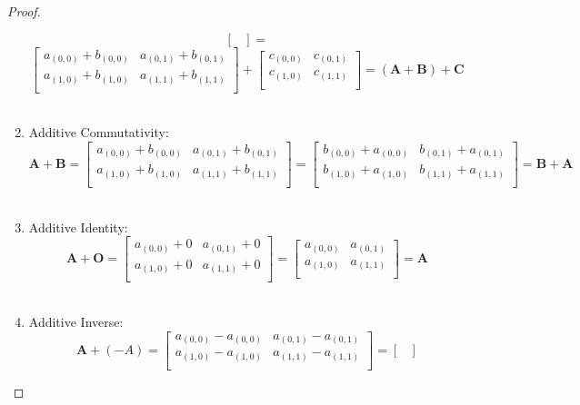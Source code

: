 \documentclass[12pt,oneside]{amsart}
\numberwithin{equation}{section}
\numberwithin{figure}{section}
\theoremstyle{plain}
\theoremstyle{definition}
\begin{document}
\begin{proof}
\begin{enumerate}
\[\begin{bmatrix}
        \end{bmatrix} = \] \[\begin{bmatrix}
        a_{(0,0)} + b_{(0,0)} & a_{(0,1)} + b_{(0,1)} \\
        a_{(1,0)} + b_{(1,0)} & a_{(1,1)} + b_{(1,1)} \\
      \end{bmatrix} + \begin{bmatrix}
        c_{(0,0)} & c_{(0,1)} \\
        c_{(1,0)} & c_{(1,1)} \\
      \end{bmatrix} = (\mathbf{A} + \mathbf{B}) + \mathbf{C}\] \\
    \item Additive Commutativity: \[\mathbf{A} + \mathbf{B} = 
        \begin{bmatrix}
          a_{(0,0)} + b_{(0,0)} & a_{(0,1)} + b_{(0,1)} \\
          a_{(1,0)} + b_{(1,0)} & a_{(1,1)} + b_{(1,1)} \\
        \end{bmatrix} = \begin{bmatrix}
          b_{(0,0)} + a_{(0,0)} & b_{(0,1)} + a_{(0,1)} \\
          b_{(1,0)} + a_{(1,0)} & b_{(1,1)} + a_{(1,1)} \\
        \end{bmatrix} = \mathbf{B} + \mathbf{A}\] \\
    \item Additive Identity: \[\mathbf{A} + \mathbf{O} = 
      \begin{bmatrix}
        a_{(0,0)} + 0 & a_{(0,1)} + 0 \\
        a_{(1,0)} + 0 & a_{(1,1)} + 0 \\
      \end{bmatrix} = \begin{bmatrix}
        a_{(0,0)} & a_{(0,1)} \\
        a_{(1,0)} & a_{(1,1)} \\
      \end{bmatrix} = \mathbf{A}\] \\
    \item Additive Inverse: \[\mathbf{A} + (-A) = 
      \begin{bmatrix}
        a_{(0,0)} - a_{(0,0)} & a_{(0,1)} - a_{(0,1)} \\
        a_{(1,0)} - a_{(1,0)} & a_{(1,1)} - a_{(1,1)} \\
      \end{bmatrix} = \begin{bmatrix}

\end{bmatrix}\]
\end{enumerate}
\end{proof}
\end{document}
